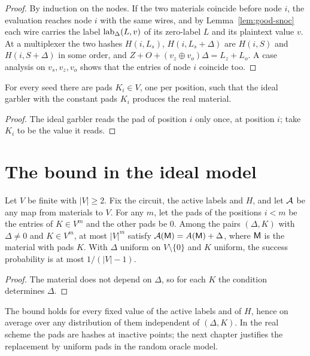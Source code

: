 \begin{proof}
  \leanok
  By induction on the nodes. If the two materials coincide before node $i$, the evaluation reaches
  node $i$ with the same wires, and by Lemma~\ref{lem:good-snoc} each wire carries the label
  $\operatorname{lab}_\Delta(L, v)$ of its zero-label $L$ and its plaintext value $v$. At a multiplexer the two
  hashes $H(i, L_s)$, $H(i, L_s + \Delta)$ are $H(i, S)$ and $H(i, S + \Delta)$ in some order, and
  $Z + O + (v_z \oplus v_o)\Delta = L_z + L_o$. A case analysis on $v_s, v_z, v_o$ shows that the
  entries of node $i$ coincide too.
\end{proof}

\begin{corollary}
  \label{cor:exists-pads}
  \leanok
  For every seed there are pads $K_i \in V$, one per position, such that the ideal garbler with the
  constant pads $K_i$ produces the real material.
\end{corollary}

\begin{proof}
  \leanok
  The ideal garbler reads the pad of position $i$ only once, at position $i$; take $K_i$ to be the
  value it reads.
\end{proof}

\section{The bound in the ideal model}

\begin{theorem}
  \label{thm:ideal-bound}
  \leanok
  Let $V$ be finite with $|V| \geq 2$. Fix the circuit, the active labels and $H$, and let $\mathcal{A}$ be any map from
  materials to $V$. For any $m$, let the pads of the positions
  $i < m$ be the entries of $K \in V^m$ and the other pads be $0$. Among the pairs $(\Delta, K)$
  with $\Delta \neq 0$ and $K \in V^m$, at most $|V|^m$ satisfy $\mathcal{A}(\mathsf{M}) = A(\mathsf{M}) + \Delta$, where $\mathsf{M}$ is the material with pads $K$. With
  $\Delta$ uniform on $V \setminus \{0\}$ and $K$ uniform, the success probability is at most
  $1/(|V| - 1)$.
\end{theorem}

\begin{proof}
  \leanok
  The material does not depend on $\Delta$, so for each $K$ the condition determines $\Delta$.
\end{proof}

The bound holds for every fixed value of the active labels and of $H$, hence on average over any
distribution of them independent of $(\Delta, K)$. In the real scheme the pads are hashes at
inactive points; the next chapter justifies the replacement by uniform pads in the random oracle
model.
